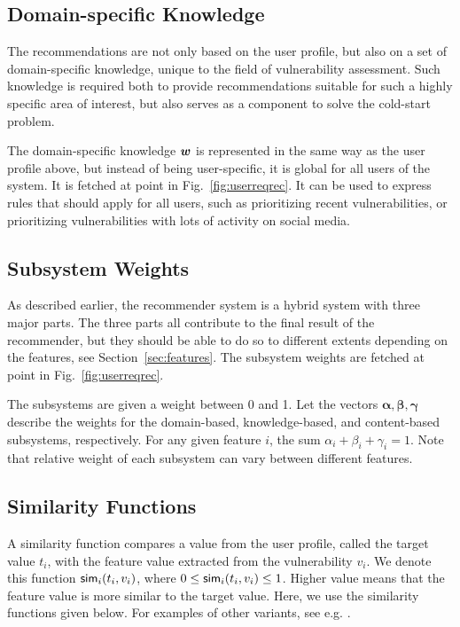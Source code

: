 {\subsection{Domain-specific Knowledge}
The recommendations are not only based on the user profile, but also on a set of domain-specific knowledge, unique to the field of vulnerability assessment.
Such knowledge is required both to provide recommendations suitable for such a highly specific area of interest, but also serves as a component to solve the cold-start problem.

The domain-specific knowledge $\bm{w}$ is represented in the same way as the user profile above, but instead of being user-specific, it is global for all users of the system.
It is fetched at point  in Fig.~\ref{fig:userreqrec}.
It can be used to express rules that should apply for all users, such as prioritizing recent vulnerabilities, or prioritizing vulnerabilities with lots of activity on social media.

\subsection{Subsystem Weights} \label{sec:subsystemweights}
As described earlier, the recommender system is a hybrid system with three major parts. The three parts all contribute to the final result of the recommender, but they should be able to do so to different extents depending on the features, see Section~\ref{sec:features}. 
The subsystem weights are fetched at point  in Fig.~\ref{fig:userreqrec}.

The subsystems are given a weight between 0 and 1. Let the vectors $\bm{\alpha}, \bm{\beta}, \bm{\gamma}$ describe the weights for the domain-based, knowledge-based, and content-based subsystems, respectively. For any given feature $i$, the sum $\alpha_i + \beta_i + \gamma_i = 1$. %
Note that relative weight of each subsystem can vary between different features.

\subsection{Similarity Functions} \label{sec:similarityfuncs}
A similarity function compares a value from the user profile, called the target value $t_i$, with the feature value extracted from the vulnerability $v_i$. We denote this function $\mathsf{sim}_i (t_i, v_i)$, where $0 \leq \mathsf{sim}_i (t_i, v_i) \leq 1$.
Higher value means that the feature value is more similar to the target value.
Here, we use the similarity functions given below. For examples of other variants, see e.g. \cite{smyth:2007}.

}

